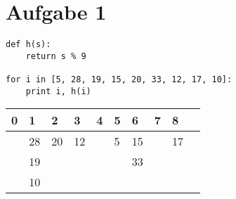\section*{Aufgabe 1}
\begin{minipage}{0.5\textwidth}
    \begin{verbatim}
def h(s): 
	return s % 9

for i in [5, 28, 19, 15, 20, 33, 12, 17, 10]: 
	print i, h(i)
    \end{verbatim}
\end{minipage}
\begin{minipage}{0.5\textwidth}
	\begin{tabularx}{\textwidth}{|*{10}{X|}}
		\hline
		0 & 1 &  2 &  3 & 4 & 5 &  6 & 7 &  8 \\
		\hline
		  & 28 & 20 & 12 &   & 5 & 15 &   & 17 \\
		  & 19 &    &    &   &   & 33 &   &    \\
		  & 10 &    &    &   &   &    &   &    \\
		\hline
	\end{tabularx}
\end{minipage}
